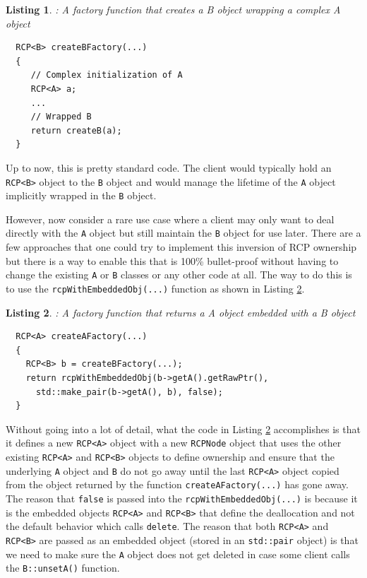 \documentclass[pdf,ps2pdf,11pt]{SANDreport}
\newtheorem{listing}{Listing}
\begin{document}
\begin{listing}: A factory function that creates a B object wrapping a complex A object \\
\label{listing:createBFactory}
{\small\begin{verbatim}
  RCP<B> createBFactory(...)
  {
     // Complex initialization of A
     RCP<A> a;
     ...
     // Wrapped B
     return createB(a);
  }
\end{verbatim}}
\end{listing}

Up to now, this is pretty standard code.  The client would typically
hold an {}\texttt{RCP<B>} object to the {}\texttt{B} object and would
manage the lifetime of the {}\texttt{A} object implicitly wrapped in
the {}\texttt{B} object.

However, now consider a rare use case where a client may only want to
deal directly with the {}\texttt{A} object but still maintain the
{}\texttt{B} object for use later.  There are a few approaches that
one could try to implement this inversion of RCP ownership but there
is a way to enable this that is 100\% bullet-proof without having to
change the existing {}\texttt{A} or {}\texttt{B} classes or any other
code at all.  The way to do this is to use the
{}\texttt{rcpWithEmbeddedObj(...)} function as shown in Listing
{}\ref{listing:A_owns_B_owns_A}.

\begin{listing}: A factory function that returns a A object
embedded with a B object \\
\label{listing:A_owns_B_owns_A}
{\small\begin{verbatim}
  RCP<A> createAFactory(...)
  {
    RCP<B> b = createBFactory(...);
    return rcpWithEmbeddedObj(b->getA().getRawPtr(),
      std::make_pair(b->getA(), b), false);
  }
\end{verbatim}}
\end{listing}

Without going into a lot of detail, what the code in Listing
{}\ref{listing:A_owns_B_owns_A} accomplishes is that it defines a new
{}\texttt{RCP<A>} object with a new {}\texttt{RCPNode} object that
uses the other existing {}\texttt{RCP<A>} and {}\texttt{RCP<B>}
objects to define ownership and ensure that the underlying
{}\texttt{A} object and {}\texttt{B} do not go away until the last
{}\texttt{RCP<A>} object copied from the object returned by the
function {}\texttt{createAFactory(...)} has gone away.  The reason
that {}\texttt{false} is passed into the
{}\texttt{rcpWithEmbeddedObj(...)} is because it is the embedded
objects {}\texttt{RCP<A>} and {}\texttt{RCP<B>} that define the
deallocation and not the default behavior which calls
{}\texttt{delete}.  The reason that both {}\texttt{RCP<A>} and
{}\texttt{RCP<B>} are passed as an embedded object (stored in an
{}\texttt{std::pair} object) is that we need to make sure the
{}\texttt{A} object does not get deleted in case some client calls the
{}\texttt{B::unsetA()} function.
\end{document}
